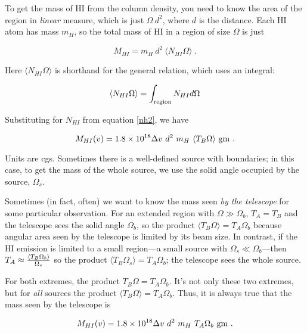 \documentclass[psfig,preprint]{aastex}
\begin{document}
	To get the mass of HI from the column density, you need to know
the area of the region in {\it linear} measure, which is just $\Omega \
d^2$, where $d$ is the distance.  Each HI atom has mass $m_H$, so the
total mass of HI in a region of size $\Omega$ is just

\begin{mathletters} \label{masseqn}
\begin{equation} 
M_{HI} = m_H \ d^2 \ \langle N_{HI} \Omega\rangle \ .
\end{equation}

\noindent Here $\langle N_{HI} \Omega \rangle$ is shorthand for the
general relation, which uses an integral:

\begin{equation}
\langle N_{HI} \Omega \rangle = \int_{\rm region} N_{HI} d \Omega
\end{equation}
\end{mathletters}

\noindent Substituting for $N_{HI}$ from equation \ref{nh2}, we have

\begin{equation}  \label{telemass}
M_{HI}(v) = 1.8 \times 10^{18} \Delta v \ d^2 \  m_H \ \langle T_B  \Omega\rangle \ {\rm
gm} \ . 
\end{equation}

\noindent Units are cgs. Sometimes there is a well-defined source with
boundaries; in this case, to get the mass of the whole source, we use
the solid angle occupied by the source, $\Omega_s$.

	Sometimes (in fact, often) we want to know the mass seen {\it by
the telescope} for some particular observation.  For an extended region
with $\Omega \gg \Omega_b$, $T_A = T_B$ and the telescope sees the solid
angle $\Omega_b$, so the product $\langle T_B \Omega\rangle = T_A
\Omega_b$ because angular area seen by the telescope is limited by its
beam size.  In contrast, if the HI emission is limited to a small
region---a small source with $\Omega_s \ll \Omega_b$---then $T_A \approx
{\langle T_B \Omega_b\rangle \over \Omega_s}$ so the product $\langle
T_B \Omega_s\rangle = T_A \Omega_b$; the telescope sees the whole
source.  

For both extremes, the product $T_B \Omega = T_A \Omega_b$. 
It's not only these two extremes, but for {\it all} sources the
product $\langle T_B \Omega \rangle= T_A \Omega_b$.  Thus, it is always true that the
mass seen by the telescope is

\begin{equation}  \label{telemass1}
M_{HI}(v) = 1.8 \times 10^{18} \Delta v \ d^2 \ m_H \ T_A  \Omega_b  \ {\rm
gm} \ . 
\end{equation}
\end{document}
